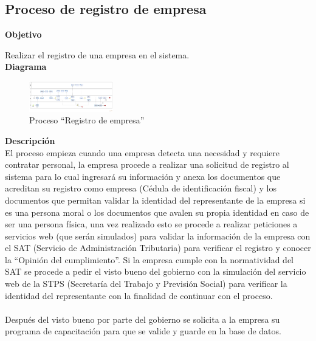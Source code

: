 




\newpage
\subsection{Proceso de registro de empresa}

\textbf{Objetivo} 

Realizar el registro de una empresa en el sistema.\\

\textbf{Diagrama} 
\begin{figure}[H]
\begin{center}
\includegraphics[angle=90, width=0.325\textwidth]{marcoTeorico/imagenes/Proceso_RegistroEmpresas.png}
\caption{Proceso ``Registro de empresa''}
\end{center}
\end{figure} 

\textbf{Descripción} \\

El proceso empieza cuando una empresa detecta una necesidad y requiere contratar personal, la empresa procede a realizar una solicitud de registro al sistema para lo cual ingresará su información y anexa los documentos que acreditan su registro como empresa (Cédula de identificación fiscal) y los documentos que permitan validar la identidad del representante de la empresa si es una persona moral o los documentos que avalen su propia identidad en caso de ser una persona física, una vez realizado esto se procede a realizar peticiones a servicios web (que serán simulados) para validar la información de la empresa con el SAT (Servicio de Administración Tributaria) para verificar el registro y conocer la “Opinión del cumplimiento”. Si la empresa cumple con la normatividad del SAT se procede a pedir el visto bueno del gobierno con la simulación del servicio web de la STPS (Secretaría del Trabajo y Previsión Social) para verificar la identidad del representante con la finalidad de continuar con el proceso.\\ \\
Después del visto bueno por parte del gobierno se solicita a la empresa su programa de capacitación para que se valide y guarde en la base de datos. \\

